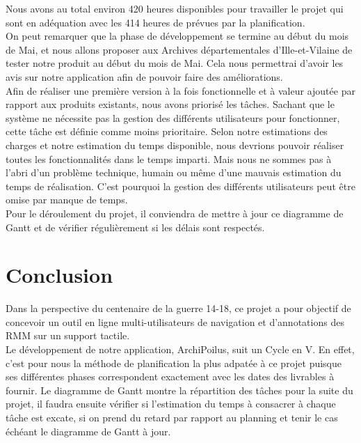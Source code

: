 \documentclass[a4paper]{article}
\begin{document}
	Nous avons au total environ 420 heures disponibles pour travailler le projet qui sont en adéquation avec les 414 heures de prévues par la planification.\\

	On peut remarquer que la phase de développement se termine au début du mois de Mai, et nous allons proposer aux Archives départementales d’Ille-et-Vilaine de tester notre produit au début du mois de Mai. Cela nous permettrai d'avoir les avis sur notre application afin de pouvoir faire des améliorations.\\

	Afin de réaliser une première version à la fois fonctionnelle et à valeur ajoutée par rapport aux produits existants, nous avons priorisé les tâches. Sachant que le système ne nécessite pas la gestion des différents utilisateurs pour fonctionner, cette tâche est définie comme moins prioritaire. Selon notre estimations des charges et notre estimation du temps disponible, nous devrions pouvoir réaliser toutes les fonctionnalités dans le temps imparti. Mais nous ne sommes pas à l'abri d'un problème technique, humain ou même d'une mauvais estimation du temps de réalisation. C'est pourquoi la gestion des différents utilisateurs peut être omise par manque de temps.\\
	
	Pour le déroulement du projet, il conviendra de mettre à jour ce diagramme de Gantt et de vérifier régulièrement si les délais sont respectés.

\newpage
{}
{}
\section*{Conclusion}

	Dans la perspective du centenaire de la guerre 14-18, ce projet a pour objectif de concevoir un outil en ligne multi-utilisateurs de navigation et d’annotations des RMM sur un support tactile.\\
	
	Le développement de notre application, ArchiPoilus, suit un Cycle en V. En effet, c'est pour nous la méthode de planification la plus adpatée à ce projet puisque ses différentes phases correspondent exactement avec les dates des livrables à fournir. Le diagramme de Gantt montre la répartition des tâches pour la suite du projet, il faudra ensuite vérifier si l'estimation du temps à consacrer à chaque tâche est excate, si on prend du retard par rapport au planning et tenir le cas échéant le diagramme de Gantt à jour.\\
	
\end{document}
